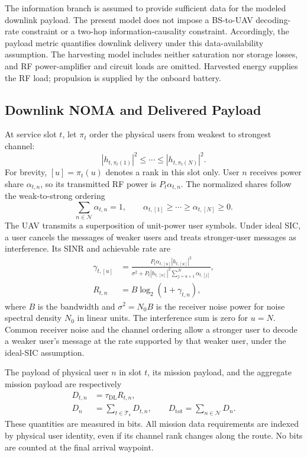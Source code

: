 \documentclass[conference]{IEEEtran}
\newcommand{\DL}{\mathrm{DL}}
\newcommand{\tot}{\mathrm{tot}}
\newcommand{\setT}{\mathcal{T}_{\mathrm{s}}}
\newcommand{\setN}{\mathcal{N}}
\begin{document}
The information branch is assumed to provide sufficient data for the modeled downlink payload. The present model does not impose a BS-to-UAV decoding-rate constraint or a two-hop information-causality constraint. Accordingly, the payload metric quantifies downlink delivery under this data-availability assumption. The harvesting model includes neither saturation nor storage losses, and RF power-amplifier and circuit loads are omitted. Harvested energy supplies the RF load; propulsion is supplied by the onboard battery.

\subsection{Downlink NOMA and Delivered Payload}
At service slot $t$, let $\pi_t$ order the physical users from weakest to strongest channel:
\begin{equation}
|h_{t,\pi_t(1)}|^2\le\cdots\le|h_{t,\pi_t(N)}|^2.
\label{eq:sic_order}
\end{equation}
For brevity, $[u]=\pi_t(u)$ denotes a rank in this slot only. User $n$ receives power share $\alpha_{t,n}$, so its transmitted RF power is $P_t\alpha_{t,n}$. The normalized shares follow the weak-to-strong ordering
\begin{equation}
\sum_{n\in\setN}\alpha_{t,n}=1,\qquad
\alpha_{t,[1]}\ge\cdots\ge\alpha_{t,[N]}\ge0.
\label{eq:allocation}
\end{equation}
The UAV transmits a superposition of unit-power user symbols. Under ideal SIC, a user cancels the messages of weaker users and treats stronger-user messages as interference. Its SINR and achievable rate are
\begin{align}
\gamma_{t,[u]}&=
\frac{P_t\alpha_{t,[u]}|h_{t,[u]}|^2}
{\sigma^2+P_t|h_{t,[u]}|^2\sum_{j=u+1}^{N}\alpha_{t,[j]}},
\label{eq:sinr}\\
R_{t,n}&=B\log_2(1+\gamma_{t,n}),
\label{eq:rate}
\end{align}
where $B$ is the bandwidth and $\sigma^2=N_0B$ is the receiver noise power for noise spectral density $N_0$ in linear units. The interference sum is zero for $u=N$. Common receiver noise and the channel ordering allow a stronger user to decode a weaker user's message at the rate supported by that weaker user, under the ideal-SIC assumption.

The payload of physical user $n$ in slot $t$, its mission payload, and the aggregate mission payload are respectively
\begin{align}
D_{t,n}&=\tau_{\DL}R_{t,n},\label{eq:slot_bits}\\
D_n&=\sum_{t\in\setT}D_{t,n},\qquad
D_{\tot}=\sum_{n\in\setN}D_n.
\label{eq:total_bits}
\end{align}
These quantities are measured in bits. All mission data requirements are indexed by physical user identity, even if its channel rank changes along the route. No bits are counted at the final arrival waypoint.
\end{document}
